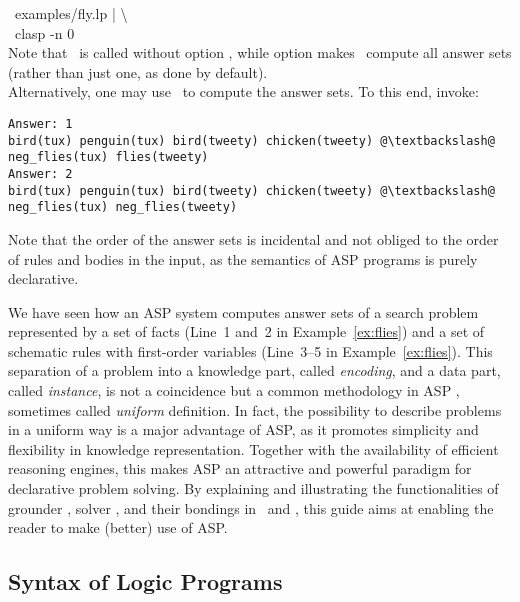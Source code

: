 \begin{example}
{{        \mbox{~}examples/fly.lp | \textbackslash\\
        \mbox{~}clasp -n 0}\\
  Note that \gringo\ is called without option ,
  while option  makes \clasp\ compute all answer sets
  (rather than just one, as done by default).
\\
  Alternatively, one may use \clingo\ to compute the answer sets.
  To this end, invoke:\\
  }
%
\begin{lstlisting}[numbers=none,escapechar=@]
Answer: 1
bird(tux) penguin(tux) bird(tweety) chicken(tweety) @\textbackslash@
neg_flies(tux) flies(tweety)
Answer: 2
bird(tux) penguin(tux) bird(tweety) chicken(tweety) @\textbackslash@
neg_flies(tux) neg_flies(tweety)
\end{lstlisting}
%
Note that the order of the answer sets is incidental and 
not obliged to the order of rules and bodies in the input,
as the semantics of ASP programs is purely declarative.
\eexample
\end{example}

We have seen how an ASP system computes answer sets of a search problem
represented by a set of facts (Line~1 and~2 in Example~\ref{ex:flies})
and a set of schematic rules with first-order variables
(Line~3--5 in Example~\ref{ex:flies}).
This separation of a problem into a knowledge part, called \emph{encoding},
and a data part, called \emph{instance}, is not a coincidence
but a common methodology in ASP \cite{martru99a,niemela99a,schlipf95a},
sometimes called \emph{uniform} definition.
In fact, the possibility to describe problems in a uniform way is
a major advantage of ASP, as it promotes simplicity and flexibility in
knowledge representation.
Together with the availability of efficient reasoning engines,
this makes ASP an attractive and powerful paradigm
for declarative problem solving.
By explaining and illustrating the functionalities of
grounder \gringo, solver \clasp, and their bondings in \clingo\ and \iclingo,
this guide aims at enabling the reader to make (better) use of ASP.


\subsection{Syntax of Logic Programs}\label{subsec:syntax}

